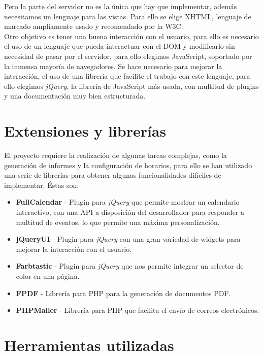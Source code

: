 Pero la parte del servidor no es la única que hay que implementar, además necesitamos un lenguaje para las vistas. Para ello se elige XHTML, lenguaje de marcado ampliamente usado y recomendado por la W3C.\\

Otro objetivo es tener una buena interacción con el usuario, para ello es necesario el uso de un lenguaje que pueda interactuar con el DOM y modificarlo sin necesidad de pasar por el servidor, para ello elegimos JavaScript, soportado por la inmensa mayoría de navegadores. Se hace necesario para mejorar la interacción, el uso de una librería que facilite el trabajo con este lenguaje, para ello elegimos {\em jQuery}, la librería de JavaScript más usada, con multitud de plugins y una documentación muy bien estructurada.\\

\section{Extensiones y librerías}

El proyecto requiere la realización de algunas tareas complejas, como la generación de informes y la configuración de horarios, para ello se han utilizado una serie de librerías para obtener algunas funcionalidades difíciles de implementar. Éstas son:

\begin{itemize}

\item {\bf FullCalendar} - Plugin para {\em jQuery} que permite mostrar un calendario interactivo, con una API a disposición del desarrollador para responder a multitud de eventos, lo que permite una máxima personalización.
\item {\bf jQueryUI} - Plugin para {\em jQuery} con una gran variedad de widgets para mejorar la interacción con el usuario.
\item {\bf Farbtastic} - Plugin para {\em jQuery} que nos permite integrar un selector de color en una página.
\item {\bf FPDF} - Librería para PHP para la generación de documentos PDF.
\item {\bf PHPMailer} - Librería para PHP que facilita el envío de correos electrónicos.
\end{itemize}

\section{Herramientas utilizadas}

